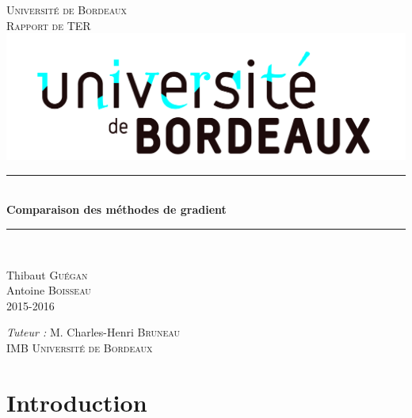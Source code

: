 \documentclass[twoside,12pt]{report}
\theoremstyle{remark}
\newcommand{\HRule}{\rule{\linewidth}{0.5mm}}
\begin{document}
\begin{titlepage}
  \begin{sffamily}
  \begin{center}

    \textsc{\LARGE Université de Bordeaux}\\[2cm]

    \textsc{\Large Rapport de TER}\\[1.5cm]
            
    \includegraphics[scale=0.11]{image/UB.jpg}
    \\[3.5cm]

    \HRule\\[0.3cm]
    { \huge \bfseries Comparaison des méthodes de gradient\\[0.5cm] }
    \HRule\\[7cm]

    \begin{minipage}{0.4\textwidth}
      \begin{flushleft} \large
        Thibaut \textsc{Guégan}\\
        Antoine \textsc{Boisseau}\\
        2015-2016
      \end{flushleft}
    \end{minipage}
    \begin{minipage}{0.4\textwidth}
      \begin{flushright} \large
        \emph{Tuteur :} M. Charles-Henri \textsc{Bruneau}\\
        IMB \textsc{Université de Bordeaux}
      \end{flushright}
    \end{minipage}

  \end{center}
  \end{sffamily}
\end{titlepage}

\tableofcontents

\chapter*{Introduction}
\end{document}
